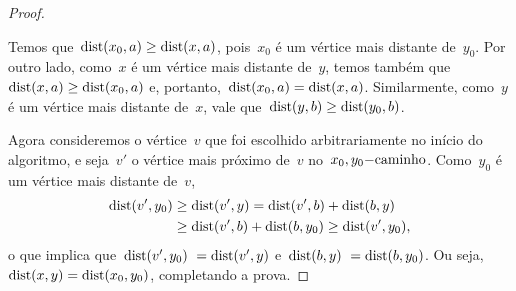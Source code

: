 \begin{proof}
			\begin{center}  \end{center}


			Temos que~${\mathrm{dist}(x_0,a)\ge \mathrm{dist}(x,a)}$,
			pois~$x_0$ é um vértice mais distante de~$y_0$.
			Por outro lado, como~$x$ é um vértice mais distante
			de~$y$, temos também que~${\mathrm{dist}(x,a)\ge \mathrm{dist}(x_0,a)}$
			e, portanto,~${\mathrm{dist}(x_0,a) =\mathrm{dist}(x,a)}$.
			Similarmente, como~$y$ é um vértice mais distante 
			de~$x$, vale que~${\mathrm{dist}(y,b) \ge \mathrm{dist}(y_0,b)}$.

			Agora consideremos o vértice~$v$ que foi escolhido 
			arbitrariamente no início do algoritmo, e seja~$v'$
			o vértice mais próximo de~$v$ no~$x_0,y_0\mathrm{-caminho}$.
			Como~$y_0$ é um vértice mais 
			distante de~$v$,
			\begin{align}
				\mathrm{dist}(v',y_0) &\ge \mathrm{dist}(v',y) =\mathrm{dist}(v',b) + 
				\mathrm{dist}(b,y)\nonumber \\
				&\ge \mathrm{dist}(v',b) + \mathrm{dist}(b,y_0) \ge \mathrm{dist}(v',y_0) 
				\nonumber,
			\end{align} 
			o que implica que~${\mathrm{dist}(v',y_0)~=\mathrm{dist}(v',y)}$ 
			e~${\mathrm{dist}(b,y)~=\mathrm{dist}(b,y_0)}$. 
			Ou seja,~${\mathrm{dist}(x,y) =\mathrm{dist}(x_0,y_0)}$,
			completando a prova.
	\end{proof}

	\bigskip
	\bigskip



